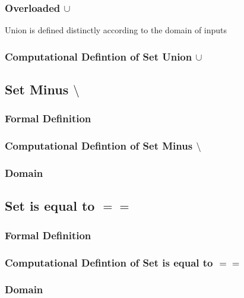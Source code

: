 \documentclass[11pt]{article}
\begin{document}
\subsubsection{Overloaded $\cup$}
Union is defined distinctly according to the domain of inputs


\subsubsection{Computational Defintion of Set Union $\cup$}











\subsection{Set Minus $\setminus$}
\subsubsection{Formal Definition}
\subsubsection{Computational Defintion of Set Minus $\setminus$}
\subsubsection{Domain}






\subsection{Set is equal to $==$}
\subsubsection{Formal Definition}
\subsubsection{Computational Defintion of Set is equal to $==$}
\subsubsection{Domain}
\end{document}
